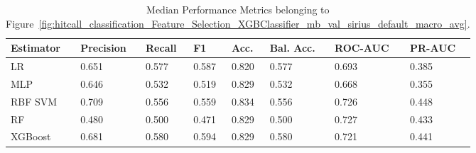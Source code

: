 \begin{longtable}{llllllll}
\caption{Median Performance Metrics belonging to Figure~\ref{fig:hitcall_classification_Feature_Selection_XGBClassifier_mb_val_sirius_default_macro_avg}.}\label{tab:table:hitcall_classification_feature_selection_xgbclassifier_mb_val_sirius_default_macro_avg}\\
\toprule
\midrule
\small Estimator & \small Precision & \small Recall & \small F1 & \small Acc. & \small Bal. Acc. & \small ROC-AUC & \small PR-AUC\\
\hline
LR & 0.651 & 0.577 & 0.587 & 0.820 & 0.577 & 0.693 & 0.385\\
MLP & 0.646 & 0.532 & 0.519 & 0.829 & 0.532 & 0.668 & 0.355\\
RBF SVM & 0.709 & 0.556 & 0.559 & 0.834 & 0.556 & 0.726 & 0.448\\
RF & 0.480 & 0.500 & 0.471 & 0.829 & 0.500 & 0.727 & 0.433\\
XGBoost & 0.681 & 0.580 & 0.594 & 0.829 & 0.580 & 0.721 & 0.441\\
\bottomrule
\end{longtable}